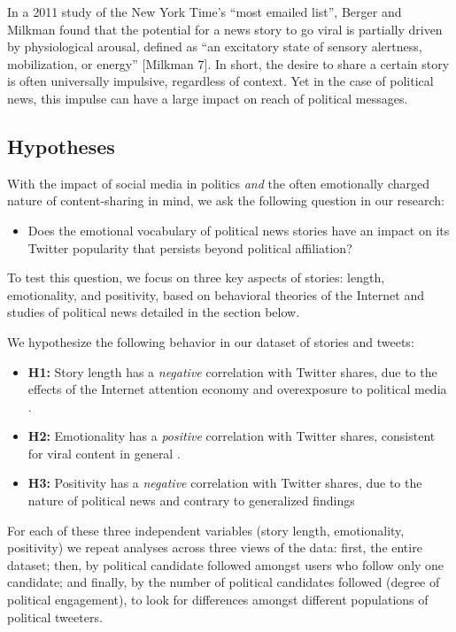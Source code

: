 \documentclass[letterpaper]{article}
\begin{document}
In a 2011 study of the New York Time’s ``most emailed list'', Berger and Milkman found that the potential for a news story to go viral is partially driven by physiological arousal, defined as ``an excitatory state of sensory alertness, mobilization, or energy'' [Milkman 7]. In short, the desire to share a certain story is often universally impulsive, regardless of context. Yet in the case of political news, this impulse can have a large impact on reach of political messages.
 

 \subsection{Hypotheses}
With the impact of social media in politics  \emph{and} the often emotionally charged nature of content-sharing in mind, we ask the following question in our research: 

\begin{itemize}
\item Does the emotional vocabulary of political news stories have an impact on its Twitter popularity that persists beyond political affiliation?  
\end{itemize}

To test this question, we focus on three key aspects of stories: length, emotionality, and positivity, based on behavioral theories of the Internet and studies of political news detailed in the section below.  

We hypothesize the following behavior in our dataset of stories and tweets:

\begin{itemize} 
    \item \textbf{H1:} Story length has a \emph{negative} correlation with Twitter shares, due to the effects of the Internet attention economy and overexposure to political media \cite{goldhaber1997attention}.
    \item \textbf{H2:} Emotionality has a \emph{positive} correlation with Twitter shares, consistent for viral content in general \cite{berger2012makes}.
    \item \textbf{H3:} Positivity has a \emph{negative} correlation with Twitter shares, due to the nature of political news and contrary to generalized findings \cite{berger2012makes}

\end{itemize}

For each of these three independent variables (story length, emotionality, positivity) we repeat analyses across three views of the data: first, the entire dataset; then, by political candidate followed amongst users who follow only one candidate; and finally, by the number of political candidates followed (degree of political engagement), to look for differences amongst different populations of political tweeters.
\end{document}
